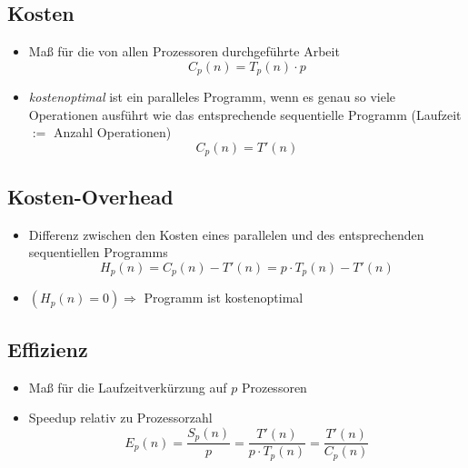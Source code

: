 \documentclass[a4paper, 12pt]{article}
\begin{document}
\subsection{Kosten}
\begin{itemize}
  \item Maß für die von allen Prozessoren durchgeführte Arbeit\\
    \[C_p(n)=T_p(n)\cdot p\]
  \item \emph{kostenoptimal} ist ein paralleles Programm, wenn es genau so viele Operationen ausführt wie das entsprechende sequentielle Programm (Laufzeit \(:=\) Anzahl Operationen)\\
    \[C_p(n)=T'(n)\]
\end{itemize}


\subsection{Kosten-Overhead}
\begin{itemize}
  \item Differenz zwischen den Kosten eines parallelen und des entsprechenden sequentiellen Programms\\
    \[H_p(n)=C_p(n)-T'(n) = p\cdot T_p(n) - T'(n)\]
  \item \((H_p(n)=0)\Rightarrow\) Programm ist kostenoptimal
\end{itemize}


\subsection{Effizienz}
\begin{itemize}
  \item Maß für die Laufzeitverkürzung auf \(p\) Prozessoren
  \item Speedup relativ zu Prozessorzahl\\
    \[E_p(n)=\frac{S_p(n)}{p}=\frac{T'(n)}{p\cdot T_p(n)}=\frac{T'(n)}{C_p(n)}\]
\end{itemize}
\end{document}
